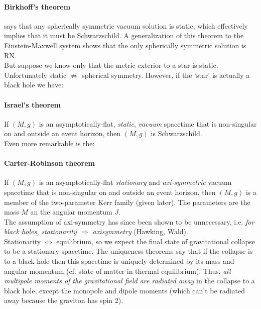 
\paragraph{Birkhoff's theorem} says that any spherically
symmetric vacuum solution is static, which effectively implies that it must be
Schwarzschild.  A generalization of this theorem to the Einstein-Maxwell
system shows that the only spherically symmetric solution is RN. \\

But suppose we know only that the metric exterior to a star is static.  
Unfortunately static $\not\Rightarrow$ spherical symmetry.  However, if the
`star' is actually a black hole we have:

\paragraph{Israel's theorem} If $(M,g)$ is an 
asymptotically-flat, \emph{static}, \emph{vacuum} spacetime that is non-singular
on and outside an event horizon, then $(M,g)$ is Schwarzschild. \\

Even more remarkable is the:

\paragraph{Carter-Robinson theorem} If 
$(M,g)$ is an asymptotically-flat \emph{stationary} and \emph{axi-symmetric}
vacuum spacetime that is non-singular on and outside an event horizon, then
$(M,g)$ is a member of the two-parameter Kerr family (given later).  The
parameters are the mass $M$ an the angular momentum $J$. \\

The assumption of axi-symmetry has since been shown to be unnecessary, i.e. 
\emph{for black holes, stationarity $\Rightarrow$ axisymmetry} (Hawking, Wald).
\\

Stationarity $\Leftrightarrow$ equilibrium, so we expect the final state of 
gravitational collapse to be a stationary spacetime.  The uniqueness theorems
say that if the collapse is to a black hole then this spacetime is uniquely
determined by its mass and angular momentum (cf. state of matter in thermal
equilibrium).  Thus, \emph{all multipole moments of the gravitational field are
radiated away} in the collapse to a black hole, except the monopole and dipole
moments (which can't be radiated away because the graviton has
spin 2). \\

